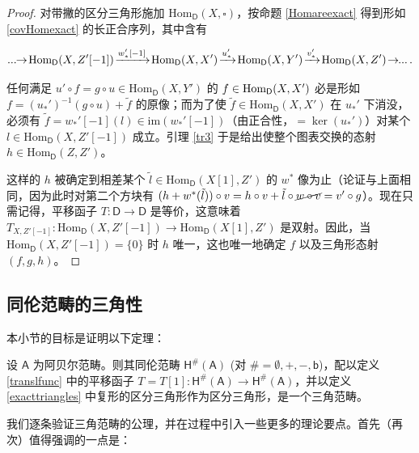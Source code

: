 \begin{proof}
	对带撇的区分三角形施加 $\text{Hom}_\mathsf{D}(X,\square)$，按命题 \ref{Homareexact} 得到形如 \eqref{covHomexact} 的长正合序列，其中含有
	\begin{small}\[
		...\mkern-6mu\rightarrow \!\textup{Hom}_\mathsf{D}(X,Z'[-1])\!\xrightarrow{w_*'[-1]}\! \textup{Hom}_\mathsf{D}(X,X')\!\xrightarrow{u_*'}\!\textup{Hom}_\mathsf{D}(X,Y')\!\xrightarrow{v_*'}\!\textup{Hom}_\mathsf{D}(X,Z')\!\rightarrow\mkern-6mu...\,.
		\]\end{small}
	任何满足 $u'\circ f= g\circ u\in\text{Hom}_\mathsf{D}(X,Y')$ 的 $f\in\textup{Hom}_\mathsf{D}(X,X')$ 必是形如 $f=(u_*')^{-1}(g\circ u)+\tilde{f}$ 的原像；而为了使 $\tilde{f}\in\text{Hom}_\mathsf{D}(X,X')$ 在 $u_*'$ 下消没，必须有 $\tilde{f}=w_*'[-1](l)\in\text{im}(w_*'[-1])$（由正合性，$=\ker(u_*')$）对某个 $l\in\text{Hom}_\mathsf{D}(X,Z'[-1])$ 成立。引理 \ref{tr3} 于是给出使整个图表交换的态射 $h\in\text{Hom}_\mathsf{D}(Z,Z')$。
	
	这样的 $h$ 被确定到相差某个 $\tilde{l}\in\text{Hom}_\mathsf{D}(X[1],Z')$ 的 $w^*$ 像为止（论证与上面相同，因为此时对第二个方块有 $(h+w^*(\tilde{l}))\circ v= h\circ v + \tilde{l}\circ \cancel{w\circ v}=v'\circ g$）。现在只需记得，平移函子 $T:\mathsf{D}\rightarrow\mathsf{D}$ 是等价，这意味着 $T_{X,Z'[-1]}:\text{Hom}_\mathsf{D}(X,Z'[-1])\rightarrow\text{Hom}_\mathsf{D}(X[1],Z')$ 是双射。因此，当 $\text{Hom}_\mathsf{D}(X,Z'[-1])=\{0\}$ 时 $h$ 唯一，这也唯一地确定 $f$ 以及三角形态射 $(f,g,h)$。
\end{proof}


\subsection{同伦范畴的三角性}


本小节的目标是证明以下定理：

\begin{Thm}\label{homotopycatistriangulated}
	设 $\mathsf{A}$ 为阿贝尔范畴。则其同伦范畴 $\mathsf{H^\#\!(A)}$ \textup(对 $\#=\emptyset,+,-,\mathsf{b}$\textup)，配以定义 \ref{translfunc} 中的平移函子 $T=T[1]:\mathsf{H^\#\!(A)}\rightarrow\mathsf{H^\#\!(A)}$，并以定义 \ref{exacttriangles} 中复形的区分三角形作为区分三角形，是一个三角范畴。
\end{Thm}

我们逐条验证三角范畴的公理，并在过程中引入一些更多的理论要点。首先（再次）值得强调的一点是：


